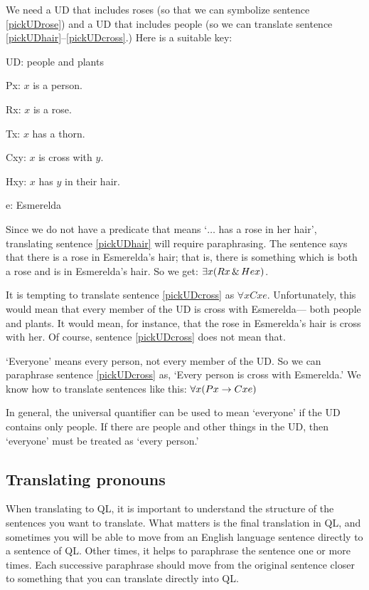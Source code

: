 We need a UD that includes roses (so that we can symbolize sentence \ref{pickUDrose}) and a UD that includes people (so we can translate sentence \ref{pickUDhair}--\ref{pickUDcross}.) Here is a suitable key:
\begin{ekey}
\item[UD:] people and plants
\item[Px:] $x$ is a person.
\item[Rx:] $x$ is a rose.
\item[Tx:] $x$ has a thorn.
\item[Cxy:] $x$ is cross with $y$.
\item[Hxy:] $x$ has $y$ in their hair.
\item[e:] Esmerelda
\end{ekey}

Since we do not have a predicate that means `$\ldots$ has a rose in her hair', translating sentence \ref{pickUDhair} will require paraphrasing. The sentence says that there is a rose in Esmerelda's hair; that is, there is something which is both a rose and is in Esmerelda's hair. So we get: $\exists x(Rx \,\&\, Hex)$.

It is tempting to translate sentence \ref{pickUDcross} as $\forall x Cxe$. Unfortunately, this would mean that every member of the UD is cross with Esmerelda--- both people and plants. It would mean, for instance, that the rose in Esmerelda's hair is cross with her. Of course, sentence \ref{pickUDcross} does not mean that.

`Everyone' means every person, not every member of the UD. So we can paraphrase sentence \ref{pickUDcross} as, `Every person is cross with Esmerelda.' We know how to translate sentences like this: $\forall x(Px \rightarrow Cxe)$

In general, the universal quantifier can be used to mean `everyone' if the UD contains only people. If there are people and other things in the UD, then `everyone' must be treated as `every person.'





\subsection{Translating pronouns}
When translating to QL, it is important to understand the structure of the sentences you want to translate. What matters is the final translation in QL, and sometimes you will be able to move from an English language sentence directly to a sentence of QL. Other times, it helps to paraphrase the sentence one or more times. Each successive paraphrase should move from the original sentence closer to something that you can translate directly into QL.

